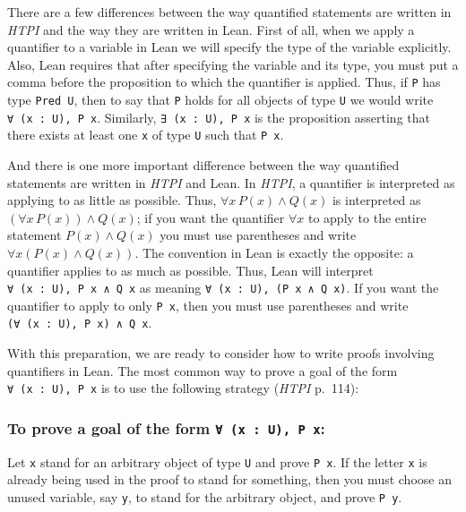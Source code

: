 \documentclass[
  letterpaper,
  DIV=11,
  numbers=noendperiod]{scrreprt}
\newenvironment{ind}
	{\begin{list}{}{\setlength{\leftmargin}{1em}}\item\relax}
	{\end{list}}
\theoremstyle{remark}
\begin{document}
There are a few differences between the way quantified statements are
written in \emph{HTPI} and the way they are written in Lean. First of
all, when we apply a quantifier to a variable in Lean we will specify
the type of the variable explicitly. Also, Lean requires that after
specifying the variable and its type, you must put a comma before the
proposition to which the quantifier is applied. Thus, if \texttt{P} has
type \texttt{Pred\ U}, then to say that \texttt{P} holds for all objects
of type \texttt{U} we would write \texttt{∀\ (x\ :\ U),\ P\ x}.
Similarly, \texttt{∃\ (x\ :\ U),\ P\ x} is the proposition asserting
that there exists at least one \texttt{x} of type \texttt{U} such that
\texttt{P\ x}.

And there is one more important difference between the way quantified
statements are written in \emph{HTPI} and Lean. In \emph{HTPI}, a
quantifier is interpreted as applying to as little as possible. Thus,
\(\forall x\, P(x) \wedge Q(x)\) is interpreted as
\((\forall x\, P(x)) \wedge Q(x)\); if you want the quantifier
\(\forall x\) to apply to the entire statement \(P(x) \wedge Q(x)\) you
must use parentheses and write \(\forall x(P(x) \wedge Q(x))\). The
convention in Lean is exactly the opposite: a quantifier applies to as
much as possible. Thus, Lean will interpret
\texttt{∀\ (x\ :\ U),\ P\ x\ ∧\ Q\ x} as meaning
\texttt{∀\ (x\ :\ U),\ (P\ x\ ∧\ Q\ x)}. If you want the quantifier to
apply to only \texttt{P\ x}, then you must use parentheses and write
\texttt{(∀\ (x\ :\ U),\ P\ x)\ ∧\ Q\ x}.

With this preparation, we are ready to consider how to write proofs
involving quantifiers in Lean. The most common way to prove a goal of
the form \texttt{∀\ (x\ :\ U),\ P\ x} is to use the following strategy
(\emph{HTPI} p.~114):

\hypertarget{to-prove-a-goal-of-the-form-x-u-p-x}{%
\subsubsection{\texorpdfstring{To prove a goal of the form
\texttt{∀\ (x\ :\ U),\ P\ x}:}{To prove a goal of the form ∀ (x : U), P x:}}\label{to-prove-a-goal-of-the-form-x-u-p-x}}

\begin{ind}
Let \texttt{x} stand for an arbitrary object of type \texttt{U} and
prove \texttt{P\ x}. If the letter \texttt{x} is already being used in
the proof to stand for something, then you must choose an unused
variable, say \texttt{y}, to stand for the arbitrary object, and prove
\texttt{P\ y}.

\end{ind}
\end{document}
